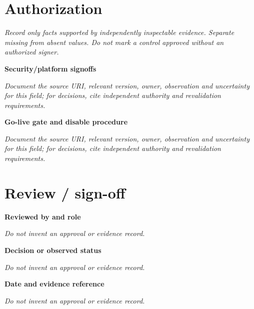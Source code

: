 \documentclass[11pt,letterpaper]{article}
\begin{document}
\section{Authorization}
\noindent\emph{Record only facts supported by independently inspectable evidence. Separate missing from absent values. Do not mark a control approved without an authorized signer.}\par
\noindent\textbf{Security/platform signoffs}\par
\noindent\emph{Document the source URI, relevant version, owner, observation and uncertainty for this field; for decisions, cite independent authority and revalidation requirements.}\par\medskip
\noindent\textbf{Go-live gate and disable procedure}\par
\noindent\emph{Document the source URI, relevant version, owner, observation and uncertainty for this field; for decisions, cite independent authority and revalidation requirements.}\par\medskip
\section{Review / sign-off}
\noindent\textbf{Reviewed by and role}\par
\emph{Do not invent an approval or evidence record.}\par\medskip
\noindent\textbf{Decision or observed status}\par
\emph{Do not invent an approval or evidence record.}\par\medskip
\noindent\textbf{Date and evidence reference}\par
\emph{Do not invent an approval or evidence record.}\par\medskip
\end{document}
